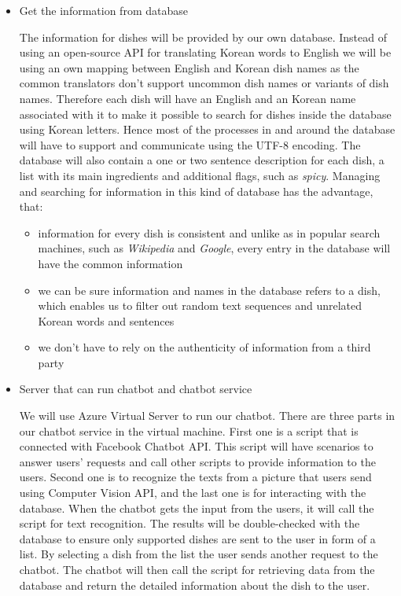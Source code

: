 \begin{itemize}
\item Get the information from database

The information for dishes will be provided by our own database. Instead of using an open-source API for translating Korean words to English we will be using an own mapping between English and Korean dish names as the common translators don't support uncommon dish names or variants of dish names. Therefore each dish will have an English and an Korean name associated with it to make it possible to search for dishes inside the database using Korean letters. Hence most of the processes in and around the database will have to support and communicate using the UTF-8 encoding. The database will also contain a one or two sentence description for each dish, a list with its main ingredients and additional flags, such as \emph{spicy}. Managing and searching for information in this kind of database has the advantage, that:

\begin{itemize}
\item information for every dish is consistent and unlike as in popular search machines, such as \emph{Wikipedia} and \emph{Google}, every entry in the database will have the common information
\item we can be sure information and names in the database refers to a dish, which enables us to filter out random text sequences and unrelated Korean words and sentences
\item we don't have to rely on the authenticity of information from a third party
\end{itemize}

\item Server that can run chatbot and chatbot service

We will use Azure Virtual Server to run our chatbot. There are three parts in our chatbot service in the virtual machine. First one is a script that is connected with Facebook Chatbot API. This script will have scenarios to answer users' requests and call other scripts to provide information to the users. Second one is to recognize the texts from a picture that users send using Computer Vision API, and the last one is for interacting with the database. When the chatbot gets the input from the users, it will call the script for text recognition. The results will be double-checked with the database to ensure only supported dishes are sent to the user in form of a list. By selecting a dish from the list the user sends another request to the chatbot. The chatbot will then call the script for retrieving data from the database and return the detailed information about the dish to the user.


\end{itemize}
